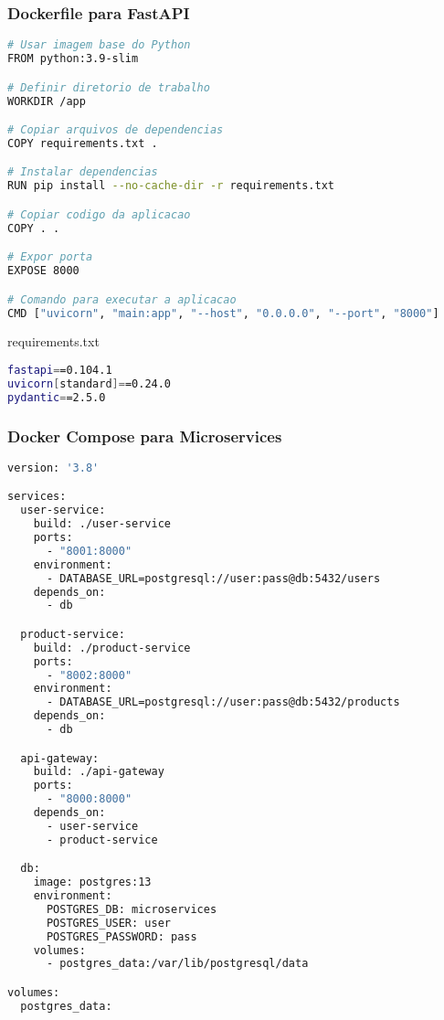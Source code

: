 \documentclass[aspectratio=169]{beamer}
\begin{document}
\begin{frame}[fragile]
    \frametitle{Dockerfile para FastAPI}
    \begin{lstlisting}[language=bash]
# Usar imagem base do Python
FROM python:3.9-slim

# Definir diretorio de trabalho
WORKDIR /app

# Copiar arquivos de dependencias
COPY requirements.txt .

# Instalar dependencias
RUN pip install --no-cache-dir -r requirements.txt

# Copiar codigo da aplicacao
COPY . .

# Expor porta
EXPOSE 8000

# Comando para executar a aplicacao
CMD ["uvicorn", "main:app", "--host", "0.0.0.0", "--port", "8000"]
    \end{lstlisting}
    
    \begin{exampleblock}{requirements.txt}
        \begin{lstlisting}[language=bash]
fastapi==0.104.1
uvicorn[standard]==0.24.0
pydantic==2.5.0
        \end{lstlisting}
    \end{exampleblock}
\end{frame}

\begin{frame}[fragile]
    \frametitle{Docker Compose para Microservices}
    \begin{lstlisting}[language=bash]
version: '3.8'

services:
  user-service:
    build: ./user-service
    ports:
      - "8001:8000"
    environment:
      - DATABASE_URL=postgresql://user:pass@db:5432/users
    depends_on:
      - db

  product-service:
    build: ./product-service
    ports:
      - "8002:8000"
    environment:
      - DATABASE_URL=postgresql://user:pass@db:5432/products
    depends_on:
      - db

  api-gateway:
    build: ./api-gateway
    ports:
      - "8000:8000"
    depends_on:
      - user-service
      - product-service

  db:
    image: postgres:13
    environment:
      POSTGRES_DB: microservices
      POSTGRES_USER: user
      POSTGRES_PASSWORD: pass
    volumes:
      - postgres_data:/var/lib/postgresql/data

volumes:
  postgres_data:
    \end{lstlisting}
\end{frame}
\end{document}
